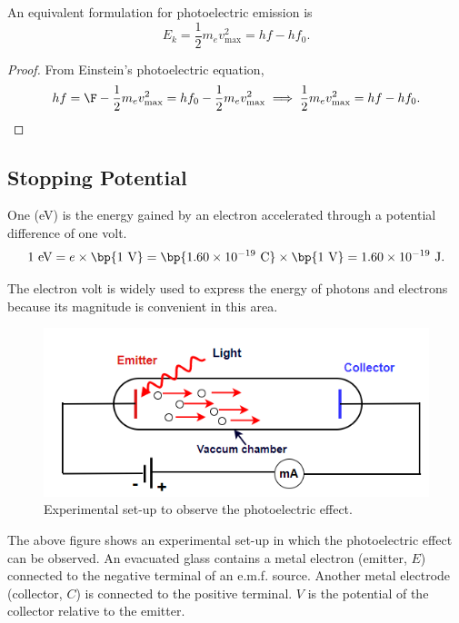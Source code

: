 \begin{corollary}
    An equivalent formulation for photoelectric emission is \[E_k = \frac12 m_e v_{\text{max}}^2 = hf - hf_0.\]
\end{corollary}
\begin{proof}
    From Einstein's photoelectric equation, \[hf = \F - \frac12 m_e v_{\text{max}}^2 = hf_0 - \frac12 m_e v_{\text{max}}^2 \implies \frac12 m_e v_{\text{max}}^2 = hf - hf_0.\]
\end{proof}

\subsection{Stopping Potential}

\begin{definition}
    One  (eV) is the energy gained by an electron accelerated through a potential difference of one volt. \[1 \text{ eV} = e \times \bp{\text{1 V}} = \bp{1.60 \times 10^{-19} \text{ C}} \times \bp{1 \text{ V}} = 1.60 \times 10^{-19} \text{ J}.\]
\end{definition}

The electron volt is widely used to express the energy of photons and electrons because its magnitude is convenient in this area.

\begin{figure}[H]
    \centering
    \includegraphics[scale=0.6]{media/Photoelectric Effect.png}
    \caption{Experimental set-up to observe the photoelectric effect.\protect\footnotemark}
\end{figure}

The above figure shows an experimental set-up in which the photoelectric effect can be observed. An evacuated glass contains a metal electron (emitter, $E$) connected to the negative terminal of an e.m.f. source. Another metal electrode (collector, $C$) is connected to the positive terminal. $V$ is the potential of the collector relative to the emitter.

